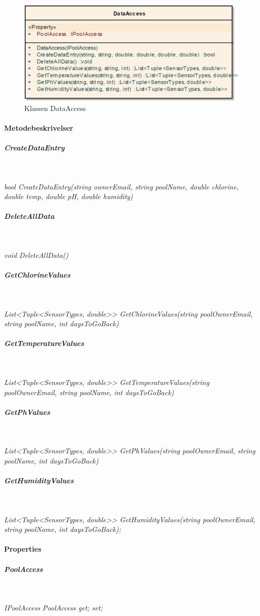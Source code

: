 \begin{figure}
\centering
\includegraphics[width=0.5\linewidth]{figs/implementering/dataAccessClassNoInherit}
\caption{Klassen DataAccess}
\label{fig:dataAccessClassNoInherit}
\end{figure}


\paragraph{Metodebeskrivelser}

\subparagraph{CreateDataEntry}\

\textit{bool CreateDataEntry(string ownerEmail, string poolName, double chlorine, double temp, double pH, double humidity)}


\subparagraph{DeleteAllData}\

\textit{void DeleteAllData()}

\subparagraph{GetChlorineValues}\

\textit{List<Tuple<SensorTypes, double>> GetChlorineValues(string poolOwnerEmail, string poolName, int daysToGoBack)}

\subparagraph{GetTemperatureValues}\

\textit{List<Tuple<SensorTypes, double>> GetTemperatureValues(string poolOwnerEmail, string poolName, int daysToGoBack)}

\subparagraph{GetPhValues}\

\textit{List<Tuple<SensorTypes, double>> GetPhValues(string poolOwnerEmail, string poolName, int daysToGoBack)}

\subparagraph{GetHumidityValues}\

\textit{List<Tuple<SensorTypes, double>> GetHumidityValues(string poolOwnerEmail, string poolName, int daysToGoBack);}

\paragraph{Properties}

\subparagraph{PoolAccess}\

\textit{IPoolAccess PoolAccess { get; set; }}


